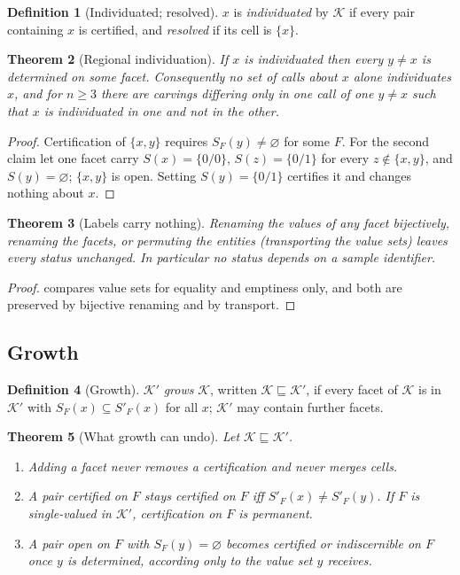 \documentclass[11pt,twocolumn,a4paper]{article}
\theoremstyle{plain}
\newtheorem{theorem}{Theorem}[section]
\theoremstyle{definition}
\newtheorem{definition}[theorem]{Definition}
\theoremstyle{remark}
\newcommand{\Kc}{\mathcal{K}}
\begin{document}
\begin{definition}[Individuated; resolved]
\label{def:individuated}
$x$ is \emph{individuated} by $\Kc$ if every pair containing $x$ is
certified, and \emph{resolved} if its cell is $\{x\}$.
\end{definition}

\begin{theorem}[Regional individuation]
\label{thm:regional}
If $x$ is individuated then every $y\ne x$ is determined on some facet.
Consequently no set of calls about $x$ alone individuates $x$, and for $n\ge3$
there are carvings differing only in one call of one $y\ne x$ such that $x$ is
individuated in one and not in the other.
\end{theorem}

\begin{proof}
Certification of $\{x,y\}$ requires $S_F(y)\ne\varnothing$ for some $F$. For the
second claim let one facet carry $S(x)=\{0/0\}$, $S(z)=\{0/1\}$ for every
$z\notin\{x,y\}$, and $S(y)=\varnothing$; $\{x,y\}$ is open. Setting
$S(y)=\{0/1\}$ certifies it and changes nothing about $x$.
\end{proof}

\begin{theorem}[Labels carry nothing]
\label{thm:labels}
Renaming the values of any facet bijectively, renaming the facets, or
permuting the entities (transporting the value sets) leaves every status
unchanged. In particular no status depends on a sample identifier.
\end{theorem}

\begin{proof}
 compares value sets for equality and emptiness only, and both
are preserved by bijective renaming and by transport.
\end{proof}

\subsection{Growth}

\begin{definition}[Growth]
\label{def:growth}
$\Kc'$ \emph{grows} $\Kc$, written $\Kc\sqsubseteq\Kc'$, if every facet of $\Kc$
is in $\Kc'$ with $S_F(x)\subseteq S'_F(x)$ for all $x$; $\Kc'$ may contain
further facets.
\end{definition}

\begin{theorem}[What growth can undo]
\label{thm:growth}
Let $\Kc\sqsubseteq\Kc'$.
\begin{enumerate}[label=\textup{(\roman*)}]
\item Adding a facet never removes a certification and never merges cells.
\item A pair certified on $F$ stays certified on $F$ iff $S'_F(x)\ne S'_F(y)$.
  If $F$ is single-valued in $\Kc'$, certification on $F$ is permanent.
\item A pair open on $F$ with $S_F(y)=\varnothing$ becomes certified or
  indiscernible on $F$ once $y$ is determined, according only to the value
  set $y$ receives.
\end{enumerate}
\end{theorem}
\end{document}
